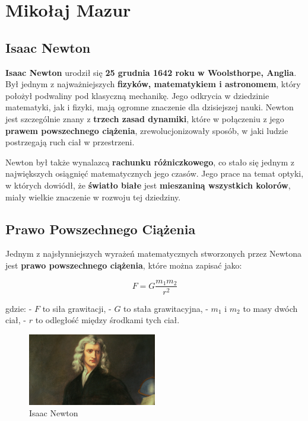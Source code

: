 \section{Mikołaj Mazur}

\subsection{Isaac Newton}
\hspace{\parindent}\textbf{Isaac Newton} urodził się \textbf{25 grudnia 1642 roku w Woolsthorpe, Anglia}. Był jednym z najważniejszych \textbf{fizyków, matematykiem i astronomem}, który położył podwaliny pod klasyczną mechanikę. Jego odkrycia w dziedzinie matematyki, jak i fizyki, mają ogromne znaczenie dla dzisiejszej nauki. Newton jest szczególnie znany z \textbf{trzech zasad dynamiki}, które w połączeniu z jego \textbf{prawem powszechnego ciążenia}, zrewolucjonizowały sposób, w jaki ludzie postrzegają ruch ciał w przestrzeni. \par
\hspace{\parindent}Newton był także wynalazcą \textbf{rachunku różniczkowego}, co stało się jednym z największych osiągnięć matematycznych jego czasów. Jego prace na temat optyki, w których dowiódł, że \textbf{światło białe} jest \textbf{mieszaniną wszystkich kolorów}, miały wielkie znaczenie w rozwoju tej dziedziny.

\subsection{Prawo Powszechnego Ciążenia}

\hspace{\parindent}Jednym z najsłynniejszych wyrażeń matematycznych stworzonych przez Newtona jest \textbf{prawo powszechnego ciążenia}, które można zapisać jako:

\[
F = G \frac{m_1 m_2}{r^2}
\]

gdzie:
- \( F \) to siła grawitacji,
- \( G \) to stała grawitacyjna,
- \( m_1 \) i \( m_2 \) to masy dwóch ciał,
- \( r \) to odległość między środkami tych ciał.

\begin{figure}[h]
    \centering
    \includegraphics[width=0.5\textwidth]{pictures/newton.jpg}
    \caption{Isaac Newton}
    \label{fig:newton}
\end{figure}
\par

